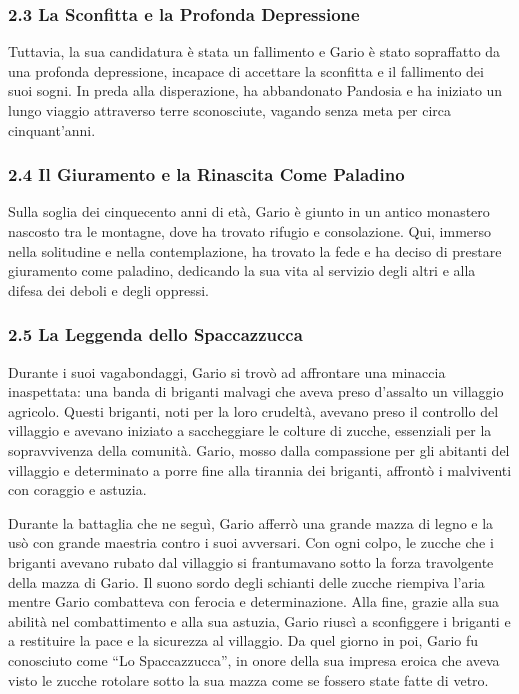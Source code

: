 \subsubsection{\texorpdfstring{\textbf{2.3 La Sconfitta e la Profonda
Depressione}}{2.3 La Sconfitta e la Profonda Depressione}}\label{la-sconfitta-e-la-profonda-depressione}

Tuttavia, la sua candidatura è stata un fallimento e Gario è stato
sopraffatto da una profonda depressione, incapace di accettare la
sconfitta e il fallimento dei suoi sogni. In preda alla disperazione, ha
abbandonato Pandosia e ha iniziato un lungo viaggio attraverso terre
sconosciute, vagando senza meta per circa cinquant'anni.

\subsubsection{\texorpdfstring{\textbf{2.4 Il Giuramento e la Rinascita
Come
Paladino}}{2.4 Il Giuramento e la Rinascita Come Paladino}}\label{il-giuramento-e-la-rinascita-come-paladino}

Sulla soglia dei cinquecento anni di età, Gario è giunto in un antico
monastero nascosto tra le montagne, dove ha trovato rifugio e
consolazione. Qui, immerso nella solitudine e nella contemplazione, ha
trovato la fede e ha deciso di prestare giuramento come paladino,
dedicando la sua vita al servizio degli altri e alla difesa dei deboli e
degli oppressi.

\subsubsection{\texorpdfstring{\textbf{2.5 La Leggenda dello
Spaccazzucca}}{2.5 La Leggenda dello Spaccazzucca}}\label{la-leggenda-dello-spaccazzucca}

Durante i suoi vagabondaggi, Gario si trovò ad affrontare una minaccia
inaspettata: una banda di briganti malvagi che aveva preso d'assalto un
villaggio agricolo. Questi briganti, noti per la loro crudeltà, avevano
preso il controllo del villaggio e avevano iniziato a saccheggiare le
colture di zucche, essenziali per la sopravvivenza della comunità.
Gario, mosso dalla compassione per gli abitanti del villaggio e
determinato a porre fine alla tirannia dei briganti, affrontò i
malviventi con coraggio e astuzia.

Durante la battaglia che ne seguì, Gario afferrò una grande mazza di
legno e la usò con grande maestria contro i suoi avversari. Con ogni
colpo, le zucche che i briganti avevano rubato dal villaggio si
frantumavano sotto la forza travolgente della mazza di Gario. Il suono
sordo degli schianti delle zucche riempiva l'aria mentre Gario
combatteva con ferocia e determinazione. Alla fine, grazie alla sua
abilità nel combattimento e alla sua astuzia, Gario riuscì a sconfiggere
i briganti e a restituire la pace e la sicurezza al villaggio. Da quel
giorno in poi, Gario fu conosciuto come ``Lo Spaccazzucca'', in onore
della sua impresa eroica che aveva visto le zucche rotolare sotto la sua
mazza come se fossero state fatte di vetro.

